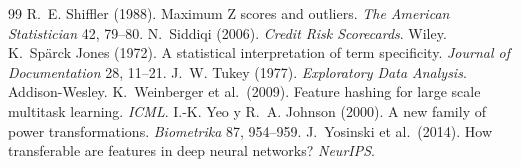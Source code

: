 \documentclass[11pt,a4paper]{article}
\theoremstyle{plain}
\theoremstyle{definition}
\theoremstyle{remark}
\newcommand{\1}{\mathbf{1}}
\begin{document}
\begin{thebibliography}{99}
 R.~E. Shiffler (1988). Maximum Z scores and outliers. \emph{The American Statistician} 42, 79--80.
 N.~Siddiqi (2006). \emph{Credit Risk Scorecards}. Wiley.
 K.~Spärck Jones (1972). A statistical interpretation of term specificity. \emph{Journal of Documentation} 28, 11--21.
 J.~W. Tukey (1977). \emph{Exploratory Data Analysis}. Addison-Wesley.
 K.~Weinberger et al.\ (2009). Feature hashing for large scale multitask learning. \emph{ICML}.
 I.-K. Yeo y R.~A. Johnson (2000). A new family of power transformations. \emph{Biometrika} 87, 954--959.
 J.~Yosinski et al.\ (2014). How transferable are features in deep neural networks? \emph{NeurIPS}.
\end{thebibliography}
\end{document}
